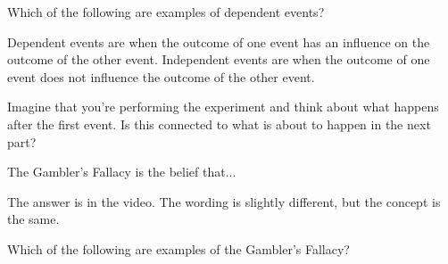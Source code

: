 \documentclass{ximera}
\begin{document}
\begin{question}
Which of the following are examples of dependent events?
  \begin{solution}
    \begin{multiple-choice}
      \end{multiple-choice}
    \begin{hint}
    Dependent events are when the outcome of one event has an influence on the outcome of the other event. Independent events are when the outcome of one event does not influence the outcome of the other event.
    \end{hint}
    \begin{hint}
    Imagine that you're performing the experiment and think about what happens after the first event. Is this connected to what is about to happen in the next part?
    \end{hint}
  \end{solution}
\end{question}

\begin{question}
The Gambler's Fallacy is the belief that...
  \begin{solution}
    \begin{multiple-choice}
      \end{multiple-choice}
    \begin{hint}
    The answer is in the video. The wording is slightly different, but the concept is the same.
    \end{hint}
  \end{solution}
\end{question}

\begin{question}
Which of the following are examples of the Gambler's Fallacy?
  \begin{solution}
    \begin{multiple-choice}
      \end{multiple-choice}
  \end{solution}
\end{question}
\end{document}
